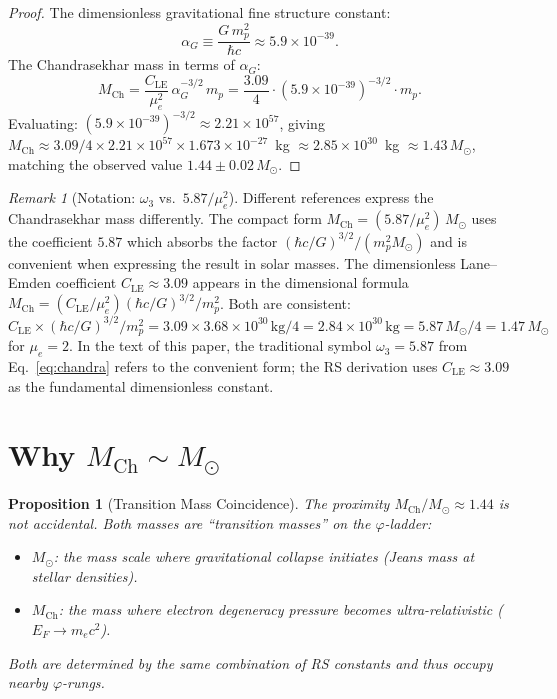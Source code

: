 \documentclass[12pt,a4paper]{article}
\newtheorem{proposition}[theorem]{Proposition}
\theoremstyle{definition}
\theoremstyle{remark}
\newtheorem{remark}[theorem]{Remark}
\begin{document}
\begin{proof}
The dimensionless gravitational fine structure constant:
\begin{equation}
  \alpha_G \equiv \frac{G\,m_p^2}{\hbar c}
  \approx 5.9 \times 10^{-39}.
\end{equation}
The Chandrasekhar mass in terms of $\alpha_G$:
\begin{equation}
  M_{\mathrm{Ch}} = \frac{C_{\mathrm{LE}}}{\mu_e^2}\,
  \alpha_G^{-3/2}\,m_p
  = \frac{3.09}{4} \cdot (5.9 \times 10^{-39})^{-3/2}
  \cdot m_p.
\end{equation}
Evaluating: $(5.9\times10^{-39})^{-3/2} \approx 2.21\times10^{57}$,
giving $M_{\mathrm{Ch}} \approx 3.09/4 \times 2.21\times10^{57}
\times 1.673\times10^{-27}$~kg $\approx 2.85\times10^{30}$~kg
$\approx 1.43\,M_\odot$, matching the observed value
$1.44 \pm 0.02\,M_\odot$.
\end{proof}

\begin{remark}[Notation: $\omega_3$ vs.\ $5.87/\mu_e^2$]
\label{rem:omega3}
Different references express the Chandrasekhar mass differently.
The compact form $M_{\mathrm{Ch}} = (5.87/\mu_e^2)\,M_\odot$
uses the coefficient $5.87$ which absorbs the factor
$(\hbar c/G)^{3/2}/(m_p^2 M_\odot)$ and is convenient when expressing
the result in solar masses.  The dimensionless Lane--Emden coefficient
$C_{\mathrm{LE}} \approx 3.09$ appears in the dimensional formula
$M_{\mathrm{Ch}} = (C_{\mathrm{LE}}/\mu_e^2)(\hbar c/G)^{3/2}/m_p^2$.
Both are consistent: $C_{\mathrm{LE}} \times (\hbar c/G)^{3/2}/m_p^2
= 3.09 \times 3.68 \times 10^{30}\,\mathrm{kg}/4 = 2.84\times10^{30}\,\mathrm{kg}
= 5.87\,M_\odot / 4 = 1.47\,M_\odot$ for $\mu_e = 2$.
In the text of this paper, the traditional symbol $\omega_3 = 5.87$
from Eq.~\eqref{eq:chandra} refers to the convenient form; the
RS derivation uses $C_{\mathrm{LE}} \approx 3.09$ as the
fundamental dimensionless constant.
\end{remark}

\section{Why $M_{\mathrm{Ch}} \sim M_\odot$}
\label{sec:coincidence}

\begin{proposition}[Transition Mass Coincidence]
\label{prop:coincidence}
The proximity $M_{\mathrm{Ch}}/M_\odot \approx 1.44$ is not
accidental.  Both masses are ``transition masses'' on the
$\varphi$-ladder:
\begin{itemize}[nosep]
  \item $M_\odot$: the mass scale where gravitational collapse
  initiates (Jeans mass at stellar densities).
  \item $M_{\mathrm{Ch}}$: the mass where electron degeneracy
  pressure becomes ultra-relativistic ($E_F \to m_e c^2$).
\end{itemize}
Both are determined by the same combination of RS constants and
thus occupy nearby $\varphi$-rungs.
\end{proposition}
\end{document}
